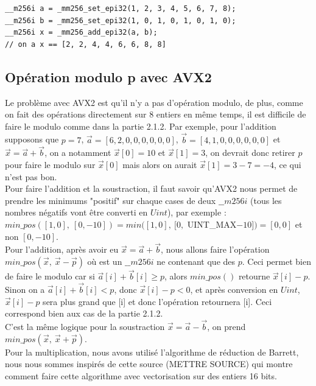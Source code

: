 \documentclass[12pt, a4paper]{article}
\begin{document}
\begin{lstlisting}
__m256i a = _mm256_set_epi32(1, 2, 3, 4, 5, 6, 7, 8);
__m256i b = _mm256_set_epi32(1, 0, 1, 0, 1, 0, 1, 0);
__m256i x = _mm256_add_epi32(a, b);
// on a x == [2, 2, 4, 4, 6, 6, 8, 8]
\end{lstlisting}

\subsection{Opération modulo p avec AVX2}

Le problème avec AVX2 est qu'il n'y a pas d'opération modulo, de plus, comme on fait des opérations directement sur 8 entiers en même temps, il est difficile de faire le modulo comme dans la partie 2.1.2. Par exemple, pour l'addition supposons que $p = 7$, $\overrightarrow{a} = [6, 2, 0, 0, 0, 0, 0, 0]$, $\overrightarrow{b} = [4, 1, 0, 0, 0, 0, 0, 0]$ et $\overrightarrow{x} = \overrightarrow{a}+\overrightarrow{b}$, on a notamment $\overrightarrow{x}[0] = 10$ et $\overrightarrow{x}[1] = 3$, on devrait donc retirer $p$ pour faire le modulo sur $\overrightarrow{x}[0]$ mais alors on aurait $\overrightarrow{x}[1] = 3-7 = -4$, ce qui n'est pas bon.\\ 
Pour faire l'addition et la soustraction, il faut savoir qu'AVX2 nous permet de prendre les minimums "positif" sur chaque cases de deux $\_\_m256i$ (tous les nombres négatifs vont être converti en $Uint$), par exemple :\\ $min\_pos([1, 0],\  [0, -10]) = min([1, 0], \ [0,$ UINT\_MAX$-10]) = [0, 0]$ et non $[0, -10]$. \\
Pour l'addition, après avoir eu $\overrightarrow{x} = \overrightarrow{a}+\overrightarrow{b}$, nous allons faire l'opération $min\_pos(\overrightarrow{x},\ \overrightarrow{x}-\overrightarrow{p})$ où  est un $\_\_m256i$ ne contenant que des $p$. Ceci permet bien de faire le modulo car si $\overrightarrow{a}[i] + \overrightarrow{b}[i] \geq p$, alors $min\_pos()$ retourne $\overrightarrow{x}[i] - p$. Sinon on a $\overrightarrow{a}[i] + \overrightarrow{b}[i] < p$, donc $\overrightarrow{x}[i]-p < 0$, et après conversion en $Uint$, $\overrightarrow{x}[i]-p$ sera plus grand que [i] et donc l'opération retournera [i]. Ceci correspond bien aux cas de la partie 2.1.2. \\
C'est la même logique pour la soustraction $\overrightarrow{x} = \overrightarrow{a}-\overrightarrow{b}$, on prend $min\_pos(\overrightarrow{x},\ \overrightarrow{x}+\overrightarrow{p})$. \\
Pour la multiplication, nous avons utilisé l'algorithme de réduction de Barrett, nous nous sommes inspirés de cette source (METTRE SOURCE) qui montre comment faire cette algorithme avec vectorisation sur des entiers 16 bits.
\end{document}
